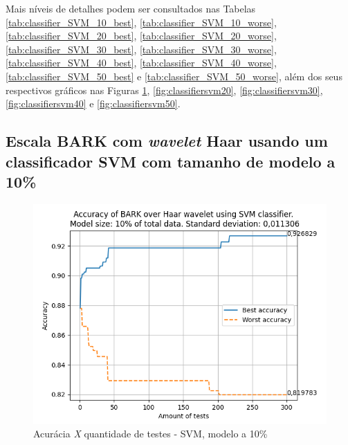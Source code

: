 		\par Mais níveis de detalhes podem ser consultados nas Tabelas \ref{tab:classifier_SVM_10_best}, \ref{tab:classifier_SVM_10_worse}, \ref{tab:classifier_SVM_20_best}, \ref{tab:classifier_SVM_20_worse}, \ref{tab:classifier_SVM_30_best}, \ref{tab:classifier_SVM_30_worse}, \ref{tab:classifier_SVM_40_best}, \ref{tab:classifier_SVM_40_worse}, \ref{tab:classifier_SVM_50_best} e \ref{tab:classifier_SVM_50_worse}, além dos seus respectivos gráficos nas Figuras \ref{fig:classifiersvm10}, \ref{fig:classifiersvm20}, \ref{fig:classifiersvm30}, \ref{fig:classifiersvm40} e \ref{fig:classifiersvm50}.

		

		\newpage		
		\subsection{Escala BARK com \textit{wavelet} Haar usando um classificador SVM com tamanho de modelo a 10\%}
			
			\begin{figure}[ht]
				\centering
				\includegraphics[width=\linewidth]{images/results/confusionMatrices/classifier_SVM_10.png}
				\caption{Acurácia \textit{X} quantidade de testes - SVM, modelo a 10\%}
				\label{fig:classifiersvm10}
			\end{figure}
		
